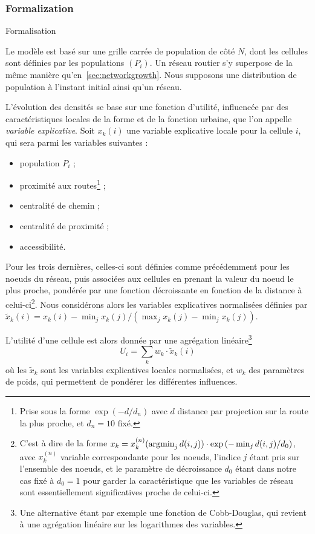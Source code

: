 \subsubsection{Formalization}{Formalisation}


Le modèle est basé sur une grille carrée de population de côté $N$, dont les cellules sont définies par les populations $(P_i)$. Un réseau routier s'y superpose de la même manière qu'en~\ref{sec:networkgrowth}. Nous supposons une distribution de population à l'instant initial ainsi qu'un réseau.


L'évolution des densités se base sur une fonction d'utilité, influencée par des caractéristiques locales de la forme et de la fonction urbaine, que l'on appelle \emph{variable explicative}. Soit $x_k(i)$ une variable explicative locale pour la cellule $i$, qui sera parmi les variables suivantes : 
\begin{itemize}
	\item population $P_i$ ;
	\item proximité aux routes\footnote{Prise sous la forme $\exp (-d / d_n)$ avec $d$ distance par projection sur la route la plus proche, et $d_n =10$ fixé.} ;
	\item centralité de chemin ;
	\item centralité de proximité ;
	\item accessibilité.
\end{itemize}
Pour les trois dernières, celles-ci sont définies comme précédemment pour les noeuds du réseau, puis associées aux cellules en prenant la valeur du noeud le plus proche, pondérée par une fonction décroissante en fonction de la distance à celui-ci\footnote{C'est à dire de la forme $x_k = x^{(n)}_k (\operatorname*{\arg\!\min}_j d(i,j)) \cdot \exp \left( -  \min_j d(i,j) / d_0 \right)$, avec $x^{(n)}_k$ variable correspondante pour les noeuds, l'indice $j$ étant pris sur l'ensemble des noeuds, et le paramètre de décroissance $d_0$ étant dans notre cas fixé à $d_0 = 1$ pour garder la caractéristique que les variables de réseau sont essentiellement significatives proche de celui-ci.}. Nous considérons alors les variables explicatives normalisées définies par $\tilde{x}_k(i) = x_k(i) - \min_j x_k(j) / (\max_j x_k(j) - \min_j x_k(j))$. 

L'utilité d'une cellule est alors donnée par une agrégation linéaire\footnote{Une alternative étant par exemple une fonction de Cobb-Douglas, qui revient à une agrégation linéaire sur les logarithmes des variables.}
\[
U_i = \sum_k w_k \cdot \tilde{x}_k(i)
\]
où les $\tilde{x}_k$ sont les variables explicatives locales normalisées, et $w_k$ des paramètres de poids, qui permettent de pondérer les différentes influences.


